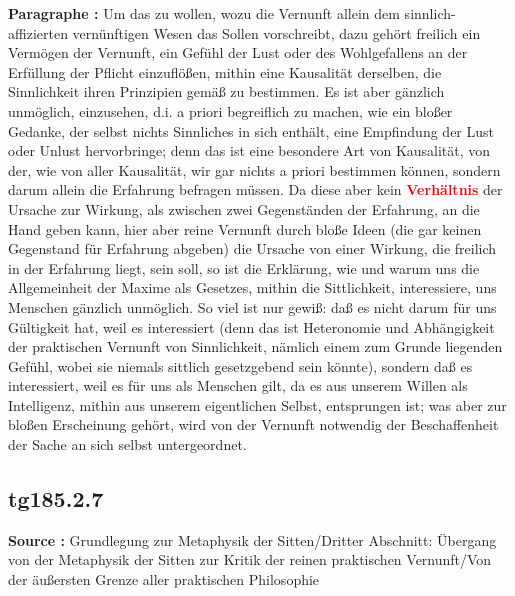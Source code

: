 \documentclass[a4paper,12pt,twoside]{book}
\newcommand{\match}[1]{\textcolor{red}{\textbf{#1}}}
\begin{document}
	\textbf{Paragraphe : }Um das zu wollen, wozu die Vernunft allein dem sinnlich-affizierten vernünftigen Wesen das Sollen vorschreibt, dazu gehört freilich ein Vermögen der Vernunft, ein Gefühl der Lust oder des Wohlgefallens an der Erfüllung der Pflicht einzuflößen, mithin eine Kausalität derselben, die Sinnlichkeit ihren Prinzipien gemäß zu bestimmen. Es ist aber gänzlich unmöglich, einzusehen, d.i. a priori begreiflich zu machen, wie ein bloßer Gedanke, der selbst nichts Sinnliches in sich enthält, eine Empfindung der Lust oder Unlust hervorbringe; denn das ist eine besondere Art von Kausalität, von der, wie von aller Kausalität, wir gar nichts a priori bestimmen können, sondern darum allein die Erfahrung befragen müssen. Da diese aber kein \match{Verhältnis} der Ursache zur Wirkung, als zwischen zwei Gegenständen der Erfahrung, an die Hand geben kann, hier aber reine Vernunft durch bloße Ideen (die gar keinen Gegenstand für Erfahrung abgeben) die Ursache von einer Wirkung, die freilich in der Erfahrung liegt, sein soll, so ist die Erklärung, wie und warum uns die Allgemeinheit der Maxime als Gesetzes, mithin die Sittlichkeit, interessiere, uns Menschen gänzlich unmöglich. So viel ist nur gewiß: daß es nicht darum für uns Gültigkeit hat, weil es interessiert (denn das ist Heteronomie und Abhängigkeit der praktischen Vernunft von Sinnlichkeit, nämlich einem zum Grunde liegenden Gefühl, wobei sie niemals sittlich gesetzgebend sein könnte), sondern daß es interessiert, weil es für uns als Menschen gilt, da es aus unserem Willen als Intelligenz, mithin aus unserem eigentlichen Selbst, entsprungen ist; was aber zur bloßen Erscheinung gehört, wird von der Vernunft notwendig der Beschaffenheit der Sache an sich selbst untergeordnet.
	
	
	\subsection*{tg185.2.7} 
	\textbf{Source : }Grundlegung zur Metaphysik der Sitten/Dritter Abschnitt: Übergang von der Metaphysik der Sitten zur Kritik der reinen praktischen Vernunft/Von der äußersten Grenze aller praktischen Philosophie\\  
	
\end{document}
